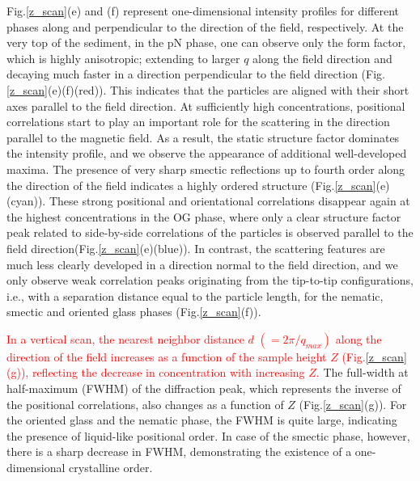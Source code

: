 \documentclass[aps,prl,preprint,superscriptaddress]{revtex4-1} %
\begin{document}
Fig.\ref{z_scan}(e) and (f) represent one-dimensional intensity profiles for different phases along and perpendicular to the direction of the field, respectively. At the very top of the sediment, in the pN phase, one can observe only the form factor, which is highly anisotropic; extending to larger $q$ along the field direction and decaying much faster in a direction perpendicular to the field direction (Fig.\ref{z_scan}(e)(f)(red)). This indicates that the particles are aligned with their short axes parallel to the field direction. At sufficiently high concentrations, positional correlations start to play an important role for the scattering in the direction parallel to the magnetic field. As a result, the static structure factor dominates the intensity profile, and we observe the appearance of additional well-developed maxima. The presence of very sharp smectic reflections up to fourth order along the direction of the field indicates a highly ordered structure (Fig.\ref{z_scan}(e)(cyan)). These strong positional and orientational correlations disappear again at the highest concentrations in the OG phase, where only a clear structure factor peak related to side-by-side correlations of the particles is observed parallel to the field direction(Fig.\ref{z_scan}(e)(blue)). In contrast, the scattering features are much less clearly developed in a direction normal to the field direction, and we only observe weak correlation peaks originating from the tip-to-tip configurations, i.e., with a separation distance equal to the particle length, for the nematic, smectic and oriented glass phases (Fig.\ref{z_scan}(f)). \par
\textcolor{red}{In a vertical scan, the nearest neighbor distance $d$ $(=2\pi/q_{max})$ along the direction of the field increases as a function of the sample height $Z$ (Fig.\ref{z_scan}(g)), reflecting the decrease in concentration with increasing $Z$.} The full-width at half-maximum (FWHM) of the diffraction peak, which represents the inverse of the positional correlations, also changes as a function of $Z$ (Fig.\ref{z_scan}(g)). For the oriented glass and the nematic phase, the FWHM is quite large, indicating the presence of liquid-like positional order. In case of the smectic phase, however, there is a sharp decrease in FWHM, demonstrating the existence of a one-dimensional crystalline order.\par   %
\end{document}
